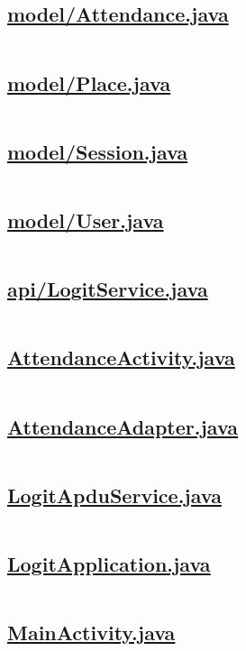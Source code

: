 \subsection{\small \url{model/Attendance.java}}
\inputminted{java}{../logit/android/app/src/main/java/ba/unsa/etf/logit/model/Attendance.java}

\subsection{\small \url{model/Place.java}}
\inputminted{java}{../logit/android/app/src/main/java/ba/unsa/etf/logit/model/Place.java}

\subsection{\small \url{model/Session.java}}
\inputminted{java}{../logit/android/app/src/main/java/ba/unsa/etf/logit/model/Session.java}

\subsection{\small \url{model/User.java}}
\inputminted{java}{../logit/android/app/src/main/java/ba/unsa/etf/logit/model/User.java}

\subsection{\small \url{api/LogitService.java}}
\inputminted{java}{../logit/android/app/src/main/java/ba/unsa/etf/logit/api/LogitService.java}

\subsection{\small \url{AttendanceActivity.java}}
\inputminted{java}{../logit/android/app/src/main/java/ba/unsa/etf/logit/AttendanceActivity.java}

\subsection{\small \url{AttendanceAdapter.java}}
\inputminted{java}{../logit/android/app/src/main/java/ba/unsa/etf/logit/AttendanceAdapter.java}

\subsection{\small \url{LogitApduService.java}}
\inputminted{java}{../logit/android/app/src/main/java/ba/unsa/etf/logit/LogitApduService.java}

\subsection{\small \url{LogitApplication.java}}
\inputminted{java}{../logit/android/app/src/main/java/ba/unsa/etf/logit/LogitApplication.java}

\subsection{\small \url{MainActivity.java}}
\inputminted{java}{../logit/android/app/src/main/java/ba/unsa/etf/logit/MainActivity.java}